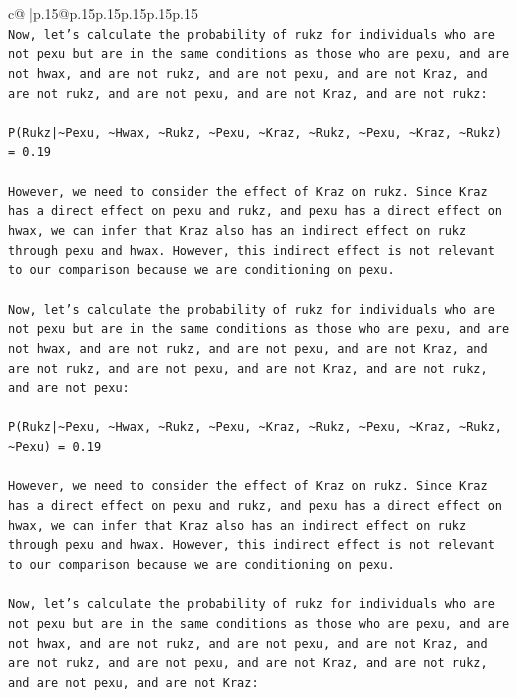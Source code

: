 \documentclass{article}
\begin{document}
{\begin{supertabular}{c@{$\;$}|p{.15\linewidth}@{}p{.15\linewidth}p{.15\linewidth}p{.15\linewidth}p{.15\linewidth}p{.15\linewidth}}
{{{\\ 
\texttt{Now, let's calculate the probability of rukz for individuals who are not pexu but are in the same conditions as those who are pexu, and are not hwax, and are not rukz, and are not pexu, and are not Kraz, and are not rukz, and are not pexu, and are not Kraz, and are not rukz:} \\
\\ 
\texttt{P(Rukz|\textasciitilde{}Pexu, \textasciitilde{}Hwax, \textasciitilde{}Rukz, \textasciitilde{}Pexu, \textasciitilde{}Kraz, \textasciitilde{}Rukz, \textasciitilde{}Pexu, \textasciitilde{}Kraz, \textasciitilde{}Rukz) = 0.19} \\
\\ 
\texttt{However, we need to consider the effect of Kraz on rukz. Since Kraz has a direct effect on pexu and rukz, and pexu has a direct effect on hwax, we can infer that Kraz also has an indirect effect on rukz through pexu and hwax. However, this indirect effect is not relevant to our comparison because we are conditioning on pexu.} \\
\\ 
\texttt{Now, let's calculate the probability of rukz for individuals who are not pexu but are in the same conditions as those who are pexu, and are not hwax, and are not rukz, and are not pexu, and are not Kraz, and are not rukz, and are not pexu, and are not Kraz, and are not rukz, and are not pexu:} \\
\\ 
\texttt{P(Rukz|\textasciitilde{}Pexu, \textasciitilde{}Hwax, \textasciitilde{}Rukz, \textasciitilde{}Pexu, \textasciitilde{}Kraz, \textasciitilde{}Rukz, \textasciitilde{}Pexu, \textasciitilde{}Kraz, \textasciitilde{}Rukz, \textasciitilde{}Pexu) = 0.19} \\
\\ 
\texttt{However, we need to consider the effect of Kraz on rukz. Since Kraz has a direct effect on pexu and rukz, and pexu has a direct effect on hwax, we can infer that Kraz also has an indirect effect on rukz through pexu and hwax. However, this indirect effect is not relevant to our comparison because we are conditioning on pexu.} \\
\\ 
\texttt{Now, let's calculate the probability of rukz for individuals who are not pexu but are in the same conditions as those who are pexu, and are not hwax, and are not rukz, and are not pexu, and are not Kraz, and are not rukz, and are not pexu, and are not Kraz, and are not rukz, and are not pexu, and are not Kraz:} \\
}}}
\end{supertabular}}
\end{document}
